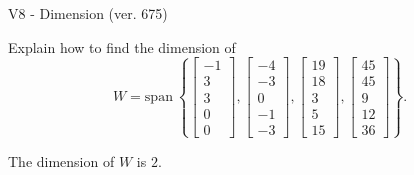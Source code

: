 \begin{exercise}
  \begin{exerciseTitle}V8 - Dimension (ver. 675)\end{exerciseTitle}
  \begin{exerciseStatement}
    Explain how to find the dimension of 
\[W=\mathrm{span}\ \left\{\left[\begin{array}{r}
-1 \\
3 \\
3 \\
0 \\
0
\end{array}\right] , \left[\begin{array}{r}
-4 \\
-3 \\
0 \\
-1 \\
-3
\end{array}\right] , \left[\begin{array}{r}
19 \\
18 \\
3 \\
5 \\
15
\end{array}\right] , \left[\begin{array}{r}
45 \\
45 \\
9 \\
12 \\
36
\end{array}\right]\right\}.\]



  \end{exerciseStatement}
  \begin{exerciseAnswer}
   The dimension of \(W\) is  \(2\).
  


  \end{exerciseAnswer}
\end{exercise}
